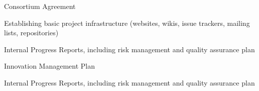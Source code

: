 \begin{workpackage}
%


\begin{wpdelivs}
\begin{wpdeliv}[due=1,id=ca,dissem=CO,nature=R,lead=PS]{Consortium Agreement}
\end{wpdeliv}

\begin{wpdeliv}[due=1,id=tickets,dissem=PU,nature=DEC,lead=PS]{Establishing basic project infrastructure 
    (websites, wikis, issue trackers, mailing lists, repositories)}
\end{wpdeliv}

\begin{wpdeliv}[due=12,lead=PS,
id=ipr,dissem=CO,nature=R]{Internal Progress Reports, including risk management and quality assurance plan}
\end{wpdeliv}

\begin{wpdeliv}[due=18,lead=PS,
id=tickets,dissem=CO,nature=R]{Innovation Management Plan}
\end{wpdeliv}

\begin{wpdeliv}[due=36,lead=PS,
id=ipr2,dissem=CO,nature=R]{Internal Progress Reports, including risk management and quality assurance plan}
\end{wpdeliv}


\end{wpdelivs}
\end{workpackage}
